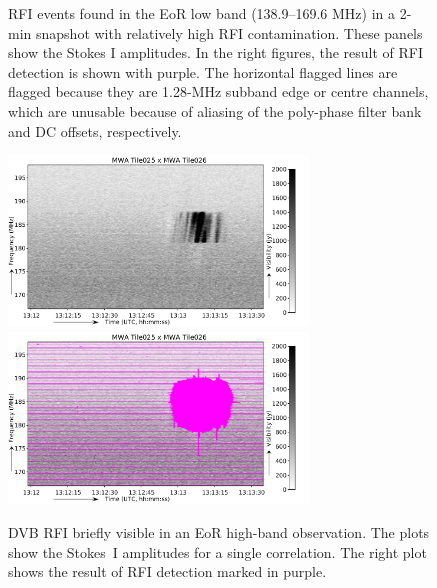 \documentclass{pasa}
\begin{document}
\begin{figure}
{\label{fig:150_2}
}%
\caption{RFI events found in the EoR low band (138.9--169.6 MHz) in a 2-min snapshot with relatively high RFI contamination. These panels show the Stokes I amplitudes. In the right figures, the result of RFI detection is shown with purple. The horizontal flagged lines are flagged because they are 1.28-MHz subband edge or centre channels, which are unusable because of aliasing of the poly-phase filter bank and DC offsets, respectively.}
\label{fig:2m-amateur-band}
\end{figure}

\noindent\begin{figure}%
\begin{center}\hspace*{-0.2cm}\includegraphics[width=8cm]{img/EoR-high-band-DVB-burst-example-noflags}\includegraphics[width=8cm]{img/EoR-high-band-DVB-burst-example-withflags}
\end{center}
\caption{DVB RFI briefly visible in an EoR high-band observation. The plots show the Stokes~I amplitudes for a single correlation. The right plot shows the result of RFI detection marked in purple.}
\label{fig:dvb-burst}
\end{figure}
\end{document}
